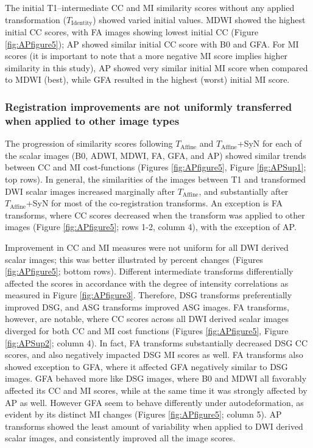 The initial T1–intermediate CC and MI similarity scores without any applied transformation ($T_{\text{Identity}}$) showed varied initial values. MDWI showed the highest initial CC scores, with FA images showing lowest initial CC (Figure \ref{fig:APfigure5}); AP showed similar initial CC score with B0 and GFA. For MI scores (it is important to note that a more negative MI score implies higher similarity in this study), AP showed very similar initial MI score when compared to MDWI (best), while GFA resulted in the highest (worst) initial MI score.

\subsubsection{Registration improvements are not uniformly transferred when applied to other image types}
The progression of similarity scores following $T_{\text{Affine}}$ and $T_{\text{Affine}}$+SyN for each of the scalar images (B0, ADWI, MDWI, FA, GFA, and AP) showed similar trends between CC and MI cost-functions (Figures \ref{fig:APfigure5},  Figure \ref{fig:APSup1}; top rows). In general, the similarities of the images between T1 and transformed DWI scalar images increased marginally after $T_{\text{Affine}}$, and substantially after $T_{\text{Affine}}$+SyN for most of the co-registration transforms. An exception is FA transforms, where CC scores decreased when the transform was applied to other images (Figure \ref{fig:APfigure5}; rows 1-2, column 4), with the exception of AP. 

Improvement in CC and MI measures were not uniform for all DWI derived scalar images; this was better illustrated by percent changes (Figures \ref{fig:APfigure5}; bottom rows). Different intermediate transforms differentially affected the scores in accordance with the degree of intensity correlations as measured in Figure \ref{fig:APfigure3}. Therefore, DSG transforms preferentially improved DSG, and ASG transforms improved ASG images. FA transforms, however, are notable, where CC scores across all DWI derived scalar images diverged for both CC and MI cost functions (Figures \ref{fig:APfigure5}, Figure \ref{fig:APSup2}; column 4). In fact, FA transforms substantially decreased DSG CC scores, and also negatively impacted DSG MI scores as well. FA transforms also showed exception to GFA, where it affected GFA negatively similar to DSG images. GFA behaved more like DSG images, where B0 and MDWI all favorably affected its CC and MI scores, while at the same time it was strongly affected by AP as well. However GFA seem to behave differently under autodeformation, as evident by its distinct MI changes (Figures \ref{fig:APfigure5}; column 5). AP transforms showed the least amount of variability when applied to DWI derived scalar images, and consistently improved all the image scores. 

